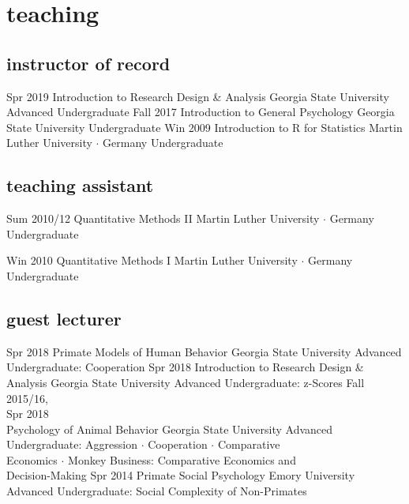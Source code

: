 \documentclass[]{friggeri-cv}
\begin{document}

\section{teaching}

\subsection{instructor of record}

\begin{entrylist}
  \entry
    {Spr 2019}
    {Introduction to Research Design \& Analysis}
    {Georgia State University}
    {Advanced Undergraduate}
  \entry
    {Fall 2017}
    {Introduction to General Psychology}
    {Georgia State University}
    {Undergraduate}
  \entry
    {Win 2009}
    {Introduction to R for Statistics}
    {Martin Luther University $\cdot$ Germany}
    {Undergraduate}
\end{entrylist}

\subsection{teaching assistant}

\begin{entrylist}
  \entry
    {Sum 2010/12}
    {Quantitative Methods II}
    {Martin Luther University $\cdot$ Germany}
    {Undergraduate}

  \entry
    {Win 2010}
    {Quantitative Methods I}
    {Martin Luther University $\cdot$ Germany}
    {Undergraduate}
\end{entrylist}

\subsection{guest lecturer}

\begin{entrylist}
  \entry
    {Spr 2018}
    {Primate Models of Human Behavior}
    {Georgia State University}
    {Advanced Undergraduate: Cooperation}
  \entry
    {Spr 2018}
    {Introduction to Research Design \& Analysis}
    {Georgia State University}
    {Advanced Undergraduate: z-Scores}
  \entry
    {Fall 2015/16,\\Spr 2018\\[-.85cm]}
    {Psychology of Animal Behavior}
    {Georgia State University}
    {Advanced Undergraduate: Aggression $\cdot$ Cooperation $\cdot$ Comparative \\
    Economics $\cdot$ Monkey Business: Comparative Economics and \\
    Decision-Making}
  \entry
    {Spr 2014}
    {Primate Social Psychology}
    {Emory University}
    {Advanced Undergraduate: Social Complexity of Non-Primates}
\end{entrylist}
\end{document}
